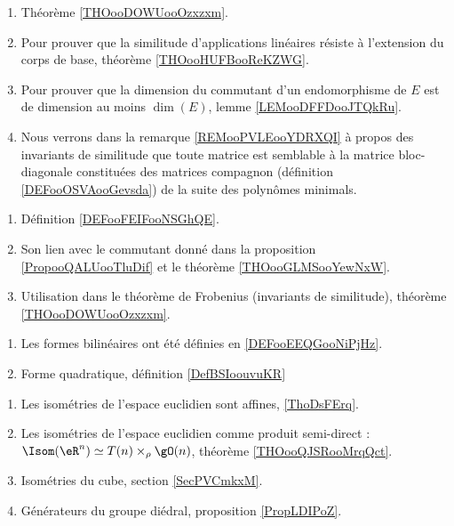     \begin{enumerate}
        \item
            Théorème \ref{THOooDOWUooOzxzxm}.
        \item
            Pour prouver que la similitude d'applications linéaires résiste à l'extension du corps de base, théorème \ref{THOooHUFBooReKZWG}.
        \item
            Pour prouver que la dimension du commutant d'un endomorphisme de \( E\) est de dimension au moins \( \dim(E)\), lemme \ref{LEMooDFFDooJTQkRu}.
        \item
            Nous verrons dans la remarque \ref{REMooPVLEooYDRXQI} à propos des invariants de similitude que toute matrice est semblable à la matrice bloc-diagonale constituées des matrices compagnon (définition \ref{DEFooOSVAooGevsda}) de la suite des polynômes minimals.
        \end{enumerate}

    \begin{enumerate}
        \item
            Définition \ref{DEFooFEIFooNSGhQE}.
        \item
            Son lien avec le commutant donné dans la proposition \ref{PropooQALUooTluDif} et le théorème \ref{THOooGLMSooYewNxW}.
        \item
            Utilisation dans le théorème de Frobenius (invariants de similitude), théorème \ref{THOooDOWUooOzxzxm}.
        \end{enumerate}

    \begin{enumerate}
\item
    Les formes bilinéaires ont été définies en \ref{DEFooEEQGooNiPjHz}.
\item
    Forme quadratique, définition \ref{DefBSIoouvuKR}
\end{enumerate}

\begin{enumerate}
    \item
        Les isométries de l'espace euclidien sont affines, \ref{ThoDsFErq}.
    \item
        Les isométries de l'espace euclidien comme produit semi-direct : $\Isom(\eR^n)\simeq T(n)\times_{\rho}\gO(n)$, théorème \ref{THOooQJSRooMrqQct}.
    \item
        Isométries du cube, section \ref{SecPVCmkxM}.
    \item 
        Générateurs du groupe diédral, proposition \ref{PropLDIPoZ}.
\end{enumerate}

